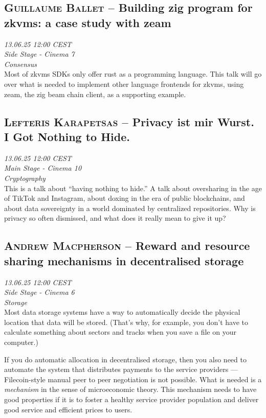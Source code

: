 \clearpage
\subsection {\textsc{Guillaume Ballet}  -- Building zig program for zkvms: a case study with zeam} \noindent \textit {13.06.25 12:00 CEST\\ Side Stage - Cinema 7\\ Consensus}\\[1em] Most of zkvms SDKs only offer rust as a programming language. This talk will go over what is needed to implement other language frontends for zkvms, using zeam, the zig beam chain client, as a supporting example.

\clearpage
\subsection {\textsc{Lefteris Karapetsas}  -- Privacy ist mir Wurst. I Got Nothing to Hide.} \noindent \textit {13.06.25 12:00 CEST\\ Main Stage - Cinema 10\\ Cryptography}\\[1em] This is a talk about ``having nothing to hide.'' A talk about oversharing in the age of TikTok and Instagram, about doxing in the era of public blockchains, and about data sovereignty in a world dominated by centralized repositories. Why is privacy so often dismissed, and what does it really mean to give it up?

\clearpage
\subsection {\textsc{Andrew Macpherson}  -- Reward and resource sharing mechanisms in decentralised storage} \noindent \textit {13.06.25 12:00 CEST\\ Side Stage - Cinema 6\\ Storage}\\[1em] Most data storage systems have a way to automatically decide the physical location that data will be stored. (That's why, for example, you don't have to calculate something about sectors and tracks when you save a file on your computer.)

If you do automatic allocation in decentralised storage, then you also need to automate the system that distributes payments to the service providers — Filecoin-style manual peer to peer negotiation is not possible. What is needed is a \emph{mechanism} in the sense of microeconomic theory. This mechanism needs to have good properties if it is to foster a healthy service provider population and deliver good service and efficient prices to users.

